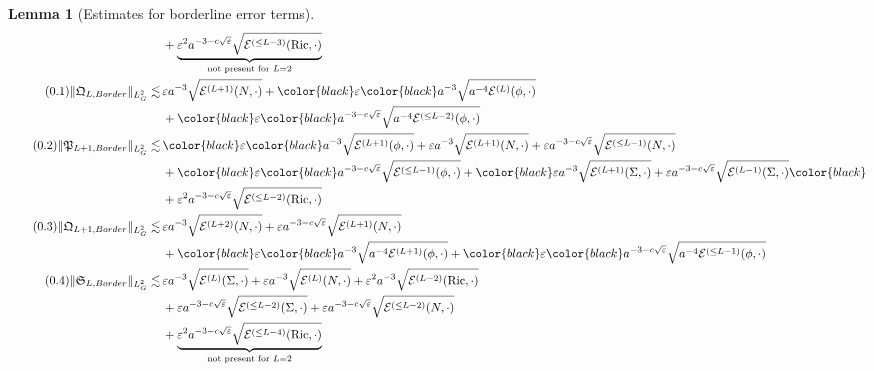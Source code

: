 \documentclass[11pt,leqno,textwidth=10cm]{amsart}
\numberwithin{equation}{section}
\theoremstyle{definition}
\theoremstyle{plain}
\newtheorem{lemma}[definition]{Lemma}
\newcommand{\1}{\mathbbm{1}}
\newcommand{\E}{\mathcal{E}}
\newcommand{\Ric}{\text{\normalfont{Ric}}}
\renewcommand{\epsilon}{\varepsilon}
\newcommand{\Lap}{\Delta}
\newcommand{\numberthis}{\addtocounter{equation}{1}\tag{\theequation}}
\renewcommand{\theequation}{\arabic{section}.\arabic{equation}}
\newcommand{\change}[1]{\color{black}#1\color{black}}
\begin{document}
\begin{lemma}[Estimates for borderline error terms]
\begin{subequations}
\begin{align*}
&\,+\underbrace{\epsilon^2 a^{-3-c\sqrt{\epsilon}}\sqrt{\E^{(\leq L-3)}(\Ric,\cdot)}}_{\text{not present for }L=2}\\
\numberthis\label{eq:L2-Border-Q-even}\|\mathfrak{Q}_{L,Border}\|_{L^2_G}\lesssim&\,\epsilon a^{-3}\sqrt{\E^{(L+1)}(N,\cdot)}%
+%
\change{\epsilon}a^{-3}\sqrt{a^{-4}\E^{(L)}(\phi,\cdot)}\\
&\,+%
\change{\epsilon}a^{-3-c\sqrt{\epsilon}}\sqrt{a^{-4}\E^{(\leq L-2)}(\phi,\cdot)}\\
\numberthis\label{eq:L2-Border-P-odd}\|\mathfrak{P}_{L+1,Border}\|_{L^2_G}\lesssim&\,%
\change{\epsilon}a^{-3}\sqrt{\E^{(L+1)}(\phi,\cdot)}+\epsilon a^{-3}\sqrt{\E^{(L+1)}(N,\cdot)}+\epsilon a^{-3-c\sqrt\epsilon}\sqrt{\E^{(\leq L-1)}(N,\cdot)}\\
&\,+\change{\epsilon}a^{-3-c\sqrt{\epsilon}}\sqrt{\E^{(\leq L-1)}(\phi,\cdot)}+\change{\epsilon a^{-3}\sqrt{\E^{(L+1)}(\Sigma,\cdot)}+\epsilon a^{-3-c\sqrt{\epsilon}}\sqrt{\E^{(L-1)}(\Sigma,\cdot)}}\\
&\,+\epsilon^2 a^{-3-c\sqrt{\epsilon}}\sqrt{\E^{(\leq L-2)}(\Ric,\cdot)}\\
\numberthis\label{eq:L2-Border-Q-odd}\|\mathfrak{Q}_{L+1,Border}\|_{L^2_G}\lesssim&\,\epsilon a^{-3}\sqrt{\E^{(L+2)}(N,\cdot)}+\epsilon a^{-3-c\sqrt{\epsilon}}\sqrt{\E^{(L+1)}(N,\cdot)}\\
&\,+\change{\epsilon} a^{-3}\sqrt{a^{-4}\E^{(L+1)}(\phi,\cdot)}+\change{\epsilon}a^{-3-c\sqrt{\epsilon}}\sqrt{a^{-4}\E^{(\leq L-1)}(\phi,\cdot)}\\
\numberthis\label{eq:L2-Border-S}\|\mathfrak{S}_{L,Border}\|_{L^2_G}\lesssim&\,\epsilon a^{-3}\sqrt{\E^{(L)}(\Sigma,\cdot)}+\epsilon a^{-3}\sqrt{\E^{(L)}(N,\cdot)}+\epsilon^2a^{-3}\sqrt{\E^{(L-2)}(\Ric,\cdot)}\\
&\,+\epsilon a^{-3-c\sqrt{\epsilon}}\sqrt{\E^{(\leq L-2)}(\Sigma,\cdot)}+\epsilon a^{-3-c\sqrt{\epsilon}}\sqrt{\E^{(\leq L-2)}(N,\cdot)}\\
&\,+\underbrace{\epsilon^2a^{-3-c\sqrt{\epsilon}}\sqrt{\E^{(\leq L-4)}(\Ric,\cdot)}}_{\text{not present for }L=2}\\

\end{align*}
\end{subequations}
\end{lemma}
\end{document}
